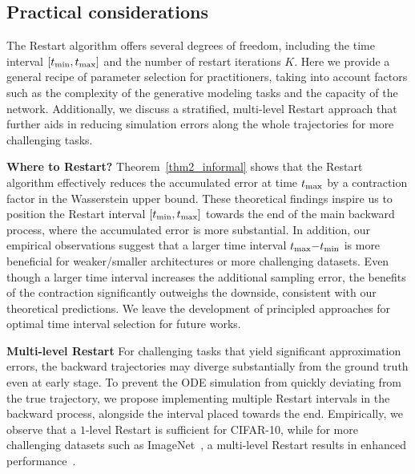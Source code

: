 \subsection{Practical considerations}
\label{sec:practical}

The Restart algorithm offers several degrees of freedom, including the time interval $[t_{\textrm{min}}, t_{\textrm{max}}]$ and the number of restart iterations $K$. Here we provide a general recipe of parameter selection for practitioners, taking into account factors such as the complexity of the generative modeling tasks and the capacity of the network. Additionally, we discuss a stratified, multi-level Restart approach that further aids in reducing simulation errors along the whole trajectories for more challenging tasks.

\textbf{Where to Restart? } Theorem~\ref{thm2_informal} shows that the Restart algorithm effectively reduces the accumulated error at time $t_{\textrm{max}}$ by a contraction factor in the Wasserstein upper bound. These theoretical findings inspire us to position the Restart interval $[t_{\textrm{min}}, t_{\textrm{max}}]$ towards the end of the main backward process, where the accumulated error is more substantial. In addition, our empirical observations suggest that a larger time interval $t_{\textrm{max}} {-} t_{\textrm{min}}$ is more beneficial for weaker/smaller architectures or more challenging datasets. Even though a larger time interval increases the additional sampling error, the benefits of the contraction significantly outweighs the downside, consistent with our theoretical predictions. We leave the development of principled approaches for optimal time interval selection for future works.

\textbf{Multi-level Restart } 
For challenging tasks that yield significant approximation errors, the backward trajectories may diverge substantially from the ground truth even at early stage. To prevent the ODE simulation from quickly deviating from the true trajectory, we propose implementing multiple Restart intervals in the backward process, alongside the interval placed towards the end. Empirically, we observe that a $1$-level Restart is sufficient for CIFAR-10, while for more challenging datasets such as ImageNet~\cite{Deng2009ImageNetAL}, a multi-level Restart results in enhanced performance~\cite{Deng2009ImageNetAL}.